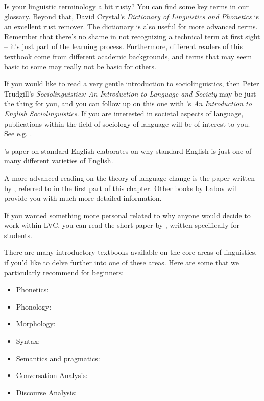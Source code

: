 \begin{furtherreading}
Is your linguistic terminology a bit rusty? You can find some key terms in our \hyperref[glossary]{glossary}. Beyond that, David Crystal's \textit{Dictionary of Linguistics and Phonetics} \citeyearpar{Crystal2003a} is an excellent rust remover. The dictionary is also useful for more advanced terms. Remember that there's no shame in not recognizing a technical term at first sight -- it's just part of the learning process. Furthermore, different readers of this textbook come from different academic backgrounds, and terms that may seem basic to some may really not be basic for others.

If you would like to read a very gentle introduction to sociolinguistics, then Peter Trudgill's \textit{Sociolinguistics: An Introduction to Language and Society} \citeyearpar{Trudgill2009} may be just the thing for you, and you can follow up on this one with \citeauthor{Trousdale2010}'s \citeyearpar{Trousdale2010} \textit{An Introduction to English Sociolinguistics}. If you are interested in societal aspects of language, publications within the field of sociology of language will be of interest to you. See e.g. \citet{Fishman1972}.

\citeauthor{Trudgill1999}'s \citeyearpar{Trudgill1999} paper on standard English elaborates on why standard English is just one of many different varieties of English.

A more advanced reading on the theory of language change is the paper written by \citet{WeinreichLabovHerzog1968}, referred to in the first part of this chapter. Other books by Labov will provide you with much more detailed information.

If you wanted something more personal related to why anyone would decide to work within LVC, you can read the short paper by \citet{Hejná2018}, written specifically for students.

There are many introductory textbooks available on the core areas of linguistics, if you'd like to delve further into one of these areas. Here are some that we particularly recommend for beginners:
\begin{itemize}
    \item Phonetics: \citet{LadefogedJohnson2014}
    \item Phonology: \citet{GussenhovenJacobs2011}
    \item Morphology: \citet{HaspelmathSims2010}
    \item Syntax: \citet{Carnie2013} 
    \item Semantics and pragmatics: \citet{Kroeger2018}
    \item Conversation Analysis: \citet{Liddicoat2007}
    \item Discourse Analysis: \citet{Gee2014}
\end{itemize}
\end{furtherreading}
